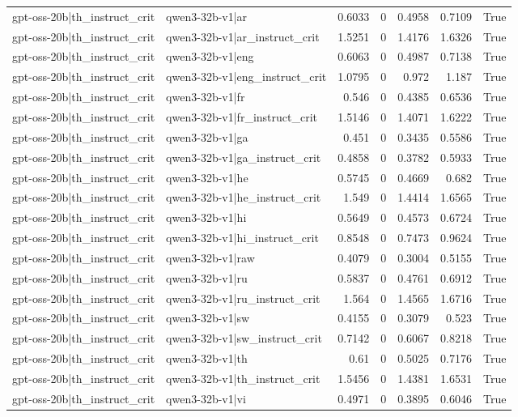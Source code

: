 \begin{table}
\begin{tabular}{l l r r r r l}
gpt-oss-20b|th_instruct_crit & qwen3-32b-v1|ar & 0.6033 & 0 & 0.4958 & 0.7109 & True \\
gpt-oss-20b|th_instruct_crit & qwen3-32b-v1|ar_instruct_crit & 1.5251 & 0 & 1.4176 & 1.6326 & True \\
gpt-oss-20b|th_instruct_crit & qwen3-32b-v1|eng & 0.6063 & 0 & 0.4987 & 0.7138 & True \\
gpt-oss-20b|th_instruct_crit & qwen3-32b-v1|eng_instruct_crit & 1.0795 & 0 & 0.972 & 1.187 & True \\
gpt-oss-20b|th_instruct_crit & qwen3-32b-v1|fr & 0.546 & 0 & 0.4385 & 0.6536 & True \\
gpt-oss-20b|th_instruct_crit & qwen3-32b-v1|fr_instruct_crit & 1.5146 & 0 & 1.4071 & 1.6222 & True \\
gpt-oss-20b|th_instruct_crit & qwen3-32b-v1|ga & 0.451 & 0 & 0.3435 & 0.5586 & True \\
gpt-oss-20b|th_instruct_crit & qwen3-32b-v1|ga_instruct_crit & 0.4858 & 0 & 0.3782 & 0.5933 & True \\
gpt-oss-20b|th_instruct_crit & qwen3-32b-v1|he & 0.5745 & 0 & 0.4669 & 0.682 & True \\
gpt-oss-20b|th_instruct_crit & qwen3-32b-v1|he_instruct_crit & 1.549 & 0 & 1.4414 & 1.6565 & True \\
gpt-oss-20b|th_instruct_crit & qwen3-32b-v1|hi & 0.5649 & 0 & 0.4573 & 0.6724 & True \\
gpt-oss-20b|th_instruct_crit & qwen3-32b-v1|hi_instruct_crit & 0.8548 & 0 & 0.7473 & 0.9624 & True \\
gpt-oss-20b|th_instruct_crit & qwen3-32b-v1|raw & 0.4079 & 0 & 0.3004 & 0.5155 & True \\
gpt-oss-20b|th_instruct_crit & qwen3-32b-v1|ru & 0.5837 & 0 & 0.4761 & 0.6912 & True \\
gpt-oss-20b|th_instruct_crit & qwen3-32b-v1|ru_instruct_crit & 1.564 & 0 & 1.4565 & 1.6716 & True \\
gpt-oss-20b|th_instruct_crit & qwen3-32b-v1|sw & 0.4155 & 0 & 0.3079 & 0.523 & True \\
gpt-oss-20b|th_instruct_crit & qwen3-32b-v1|sw_instruct_crit & 0.7142 & 0 & 0.6067 & 0.8218 & True \\
gpt-oss-20b|th_instruct_crit & qwen3-32b-v1|th & 0.61 & 0 & 0.5025 & 0.7176 & True \\
gpt-oss-20b|th_instruct_crit & qwen3-32b-v1|th_instruct_crit & 1.5456 & 0 & 1.4381 & 1.6531 & True \\
gpt-oss-20b|th_instruct_crit & qwen3-32b-v1|vi & 0.4971 & 0 & 0.3895 & 0.6046 & True \\

\end{tabular}
\end{table}
